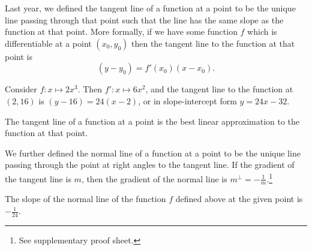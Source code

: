 


Last year, we defined the tangent line of a function at a point to be the unique line
passing through that point such that the line has the same slope as the function at that
point. More formally, if we have some function $ f $ which is differentiable at a point $ (x_0, y_0) $
then the tangent line to the function at that point is
\begin{displaymath}
  (y - y_0) = f'(x_0) (x - x_0).
\end{displaymath}

\begin{ex}
  Consider $ f : x \mapsto 2x^3 $. Then $ f' : x \mapsto 6x^2 $, and the tangent line
  to the function at $ (2, 16) $ is $ (y - 16) = 24(x - 2) $, or in slope-intercept
  form $ y = 24x - 32 $.

  \begin{center}
  \end{center}
\end{ex}

The tangent line of a function at a point is the best linear approximation to the function at that point.

We further defined the normal line of a function at a point to be the unique line passing through
the point at right angles to the tangent line. If the gradient of the tangent line is $ m $,
then the gradient of the normal line is $ m^\perp = -\frac{1}{m} $.\footnote{See supplementary proof sheet.}

\begin{ex}
  The slope of the normal line of the function $ f $ defined above at the given point is $ -\frac{1}{24} $.
\end{ex}

